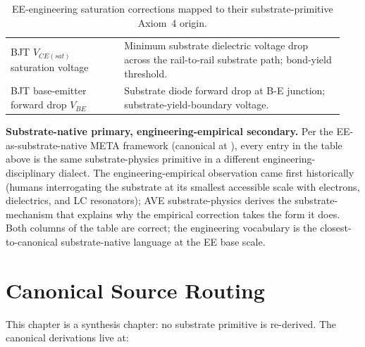 \begin{table}[htbp]
\begin{tabular}{p{0.32\linewidth} p{0.62\linewidth}}
BJT $V_{CE(sat)}$ saturation voltage & Minimum substrate dielectric voltage drop across the rail-to-rail substrate path; bond-yield threshold. \\
BJT base-emitter forward drop $V_{BE}$ & Substrate diode forward drop at B-E junction; substrate-yield-boundary voltage. \\
\bottomrule
\end{tabular}
\caption{EE-engineering saturation corrections mapped to their substrate-primitive Axiom~4 origin.}
\label{tab:vol9_saturation_ee_translation}
\end{table}

\noindent
\textbf{Substrate-native primary, engineering-empirical secondary.} Per the EE-as-substrate-native META framework (canonical at ), every entry in the table above is the same substrate-physics primitive in a different engineering-disciplinary dialect. The engineering-empirical observation came first historically (humans interrogating the substrate at its smallest accessible scale with electrons, dielectrics, and LC resonators); AVE substrate-physics derives the substrate-mechanism that explains why the empirical correction takes the form it does. Both columns of the table are correct; the engineering vocabulary is the closest-to-canonical substrate-native language at the EE base scale.

\section{Canonical Source Routing}
\label{sec:vol9_canonical_source_routing}

This chapter is a synthesis chapter: no substrate primitive is re-derived. The canonical derivations live at:

